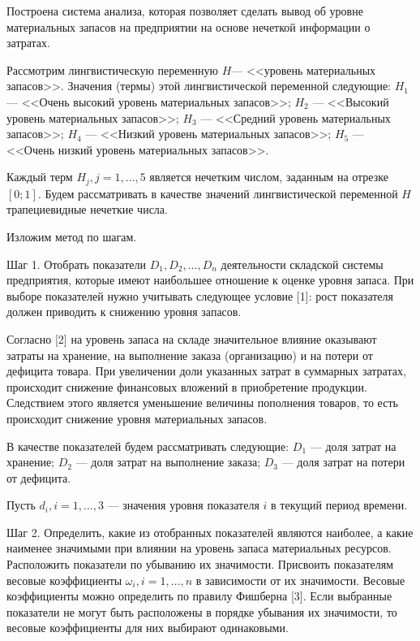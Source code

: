 
\vzmscaption

Построена система анализа, которая позволяет сделать вывод об уровне материальных запасов на предприятии на основе нечеткой информации о затратах. 

Рассмотрим лингвистическую переменную $H$--- <<уровень материальных запасов>>. Значения (термы) этой лингвистической переменной следующие:
$H_{1}$ --- <<Очень высокий уровень материальных запасов>>; 
$H_{2}$ --- <<Высокий уровень материальных запасов>>; 
$H_{3}$ --- <<Средний уровень материальных запасов>>; 
$H_{4}$ --- <<Низкий уровень материальных запасов>>; 
$H_{5}$ --- <<Очень низкий уровень материальных запасов>>.


Каждый терм $H_{j}, j = 1, \ldots, 5$ является нечетким числом, заданным на отрезке $[0; 1]$. Будем рассматривать в качестве значений лингвистической переменной $H$ трапециевидные нечеткие числа.

Изложим метод по шагам. 

Шаг 1. Отобрать показатели $D_{1}, D_{2}, \ldots, D_{n}$ деятельности складской системы предприятия, которые имеют наибольшее отношение к оценке уровня запаса. При выборе показателей нужно учитывать следующее условие [1]: рост показателя должен приводить к снижению уровня запасов. 

Согласно [2] на уровень запаса на складе значительное влияние оказывают затраты на хранение, на выполнение заказа (организацию) и на потери от дефицита товара. При увеличении доли указанных затрат в суммарных затратах, происходит снижение финансовых вложений в приобретение продукции. Следствием этого является уменьшение величины пополнения товаров, то есть происходит снижение уровня материальных запасов.

В качестве показателей будем рассматривать следующие:
$D_{1}$ --- доля затрат на хранение;
$D_{2}$ --- доля затрат на выполнение заказа;
$D_{3}$ --- доля затрат на потери от дефицита.

Пусть $d_{i}, i = 1, \ldots, 3$ --- значения уровня показателя $i$ в текущий период времени.

Шаг 2.
Определить, какие из отобранных показателей являются наиболее, а какие наименее значимыми при влиянии на уровень запаса материальных ресурсов. Расположить показатели по убыванию их значимости.
Присвоить показателям весовые коэффициенты $\omega_{i}, i = 1, \ldots, n$ в зависимости от их значимости. 
Весовые коэффициенты можно определить по правилу Фишберна [3].
Если выбранные показатели не могут быть расположены в порядке убывания их значимости, то весовые коэффициенты для них выбирают одинаковыми.


